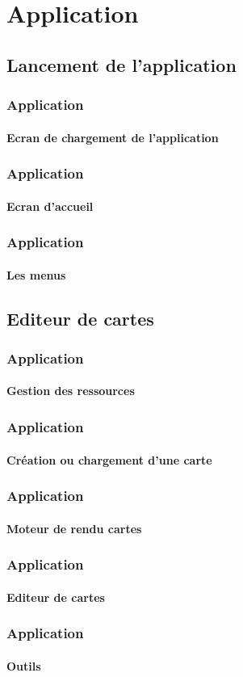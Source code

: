 \section{Application}
\subsection{Lancement de l'application}

	\begin{frame}
	\frametitle{Application}
	\framesubtitle{Ecran de chargement de l'application}
	
	\end{frame}
	
	
	\begin{frame}
	\frametitle{Application}
	\framesubtitle{Ecran d'accueil}
	
	\end{frame}
	
	\begin{frame}
	\frametitle{Application}
	\framesubtitle{Les menus}
	
	\end{frame}
	
\subsection{Editeur de cartes}

	\begin{frame}
	\frametitle{Application}
	\framesubtitle{Gestion des ressources}
	
	
	\end{frame}

	\begin{frame}
	\frametitle{Application}
	\framesubtitle{Création ou chargement d'une carte}
	
	\end{frame}
	
	\begin{frame}
	\frametitle{Application}
	\framesubtitle{Moteur de rendu cartes}
	
	\end{frame}
	
	
	\begin{frame}
	\frametitle{Application}
	\framesubtitle{Editeur de cartes}
	
	\end{frame}
	
	\begin{frame}
	\frametitle{Application}
	\framesubtitle{Outils}
	
	\end{frame}
	
